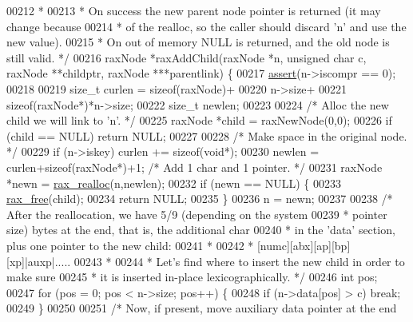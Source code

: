 \begin{DoxyCode}
{00212 \textcolor{comment}{ *}
00213 \textcolor{comment}{ * On success the new parent node pointer is returned (it may change because}
00214 \textcolor{comment}{ * of the realloc, so the caller should discard 'n' and use the new value).}
00215 \textcolor{comment}{ * On out of memory NULL is returned, and the old node is still valid. */}
00216 raxNode *raxAddChild(raxNode *n, \textcolor{keywordtype}{unsigned} \textcolor{keywordtype}{char} c, raxNode **childptr, raxNode ***parentlink) \{
00217     \hyperlink{redisassert_8h_a993abaa2c168852c1592879472938781}{assert}(n->iscompr == 0);
00218 
00219     size\_t curlen = \textcolor{keyword}{sizeof}(raxNode)+
00220                     n->size+
00221                     \textcolor{keyword}{sizeof}(raxNode*)*n->size;
00222     size\_t newlen;
00223 
00224     \textcolor{comment}{/* Alloc the new child we will link to 'n'. */}
00225     raxNode *child = raxNewNode(0,0);
00226     \textcolor{keywordflow}{if} (child == NULL) \textcolor{keywordflow}{return} NULL;
00227 
00228     \textcolor{comment}{/* Make space in the original node. */}
00229     \textcolor{keywordflow}{if} (n->iskey) curlen += \textcolor{keyword}{sizeof}(\textcolor{keywordtype}{void}*);
00230     newlen = curlen+\textcolor{keyword}{sizeof}(raxNode*)+1; \textcolor{comment}{/* Add 1 char and 1 pointer. */}
00231     raxNode *newn = \hyperlink{rax__malloc_8h_a4aa041a0e1eaa6d8476e889547280467}{rax\_realloc}(n,newlen);
00232     \textcolor{keywordflow}{if} (newn == NULL) \{
00233         \hyperlink{rax__malloc_8h_a3adfa16bca6cd23b6e125fd441465e49}{rax\_free}(child);
00234         \textcolor{keywordflow}{return} NULL;
00235     \}
00236     n = newn;
00237 
00238     \textcolor{comment}{/* After the reallocation, we have 5/9 (depending on the system}
00239 \textcolor{comment}{     * pointer size) bytes at the end, that is, the additional char}
00240 \textcolor{comment}{     * in the 'data' section, plus one pointer to the new child:}
00241 \textcolor{comment}{     *}
00242 \textcolor{comment}{     * [numc][abx][ap][bp][xp]|auxp|.....}
00243 \textcolor{comment}{     *}
00244 \textcolor{comment}{     * Let's find where to insert the new child in order to make sure}
00245 \textcolor{comment}{     * it is inserted in-place lexicographically. */}
00246     \textcolor{keywordtype}{int} pos;
00247     \textcolor{keywordflow}{for} (pos = 0; pos < n->size; pos++) \{
00248         \textcolor{keywordflow}{if} (n->data[pos] > c) \textcolor{keywordflow}{break};
00249     \}
00250 
00251     \textcolor{comment}{/* Now, if present, move auxiliary data pointer at the end}
}
\end{DoxyCode}
